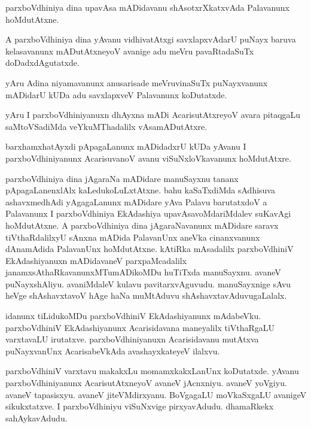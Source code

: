 \documentclass{article}
\begin{document}
\begin{mn}%
parxboVdhiniya dina upavAsa mADidavanu shAsotxrXkatxvAda Palavanunx hoMdutAtxne.
\end{mn}

\begin{mn}%
A parxboVdhiniya dina yAvanu vidhivatAtxgi savxlapxvAdarU puNayx baruva kelasavanunx mADutAtxneyoV 
avanige adu meVru pavaRtadaSuTx doDadxdAgutatxde.
\end{mn}

\begin{mn}%
yAru Adina niyamavanunx anusarisade meVruvinaSuTx puNayxvanunx mADidarU kUDa adu savxlapxveV 
Palavanunx koDutatxde.
\end{mn}

\begin{mn}%
yAru I parxboVdhiniyanuxn dhAyxna mADi AcarisutAtxreyoV avara pitaqgaLu saMtoVSadiMda 
veYkuMThadalilx vAsamADutAtxre.
\end{mn}

\begin{mn}%
barxhamxhatAyxdi pApagaLanunx mADidadxrU kUDa yAvanu I parxboVdhiniyanunx AcarisuvanoV avanu 
viSuNxloVkavanunx hoMdutAtxre.
\end{mn}

\begin{mn}%
parxboVdhiniya dina jAgaraNa mADidare manuSayxnu tananx pApagaLanenxlAlx kaLedukoLuLxtAtxne. bahu 
kaSaTxdiMda sAdhisuva ashavxmedhAdi yAgagaLanunx mADidare yAva Palavu barutatxdoV a Palavanunx I 
parxboVdhiniya EkAdashiya upavAsavoMdariMdalev suKavAgi hoMdutAtxne. A parxboVdhiniya dina 
jAgaraNavanunx mADidare saravx tiVthaRdalilxyU sAnxna mADida PalavanUnx aneVka cinanxvanunx 
dAnamAdida PalavanUnx hoMdutAtxne. kAtiRka mAsadalilx parxboVdhiniV EkAdashiyanuxn mADidavaneV 
parxpaMcadalilx janamxsAthaRkavanunxMTumADikoMDu huTiTxda manuSayxnu. avaneV puNayxshAliyu. 
avaniMdaleV kulavu pavitarxvAguvudu. manuSayxnige sAvu heVge shAshavxtavoV hAge haNa muMtAduvu 
shAshavxtavAduvugaLalalx.
\end{mn}

\begin{mn}%
idanunx tiLidukoMDu parxboVdhiniV EkAdashiyanunx mAdabeVku. parxboVdhiniV EkAdashiyanunx 
Acarisidavana maneyalilx tiVthaRgaLU varxtavaLU irutatxve. parxboVdhiniyanuxn Acarisidavanu 
mutAtxva puNayxvanUnx AcarisabeVkAda avashayxkateyeV ilalxvu.
\end{mn}

\begin{mn}%
parxboVdhiniV varxtavu makakxLu momamxkakxLanUnx koDutatxde. yAvanu parxboVdhiniyanunx 
AcarisutAtxneyoV avaneV jAcnxniyu. avaneV yoVgiyu. avaneV tapasisxyu. avaneV jiteVMdirxyanu. 
BoVgagaLU moVkaSxgaLU avanigeV sikukxtatxve. I parxboVdhiniyu viSuNxvige pirxyavAdudu. dhamaRkekx 
sahAykavAdudu.
\end{mn}
\end{document}
